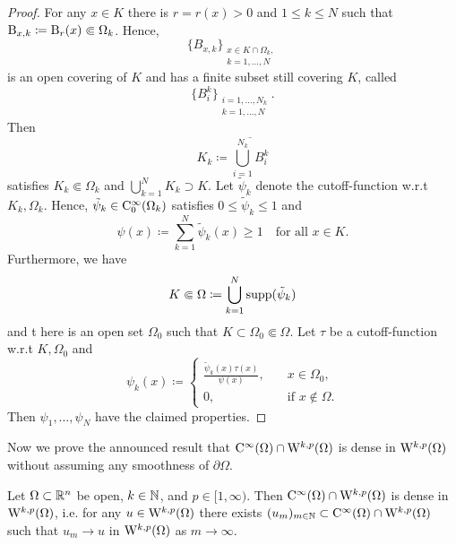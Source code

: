 \begin{proof}
  For any $x \in K$ there is $r = r(x) > 0$ and $1\leq k \leq N$ such that $\mathrm{B}_{x, k} \coloneqq \mathrm{B}_r(x) \Subset \Omega_k$.
  Hence, $$\{B_{x,k}\}_{\substack{x \in K \cap \Omega_k, \\ k = 1,\dots,N}}$$ is an open covering of $K$ and has a finite subset still covering $K$, called $$\{B_i^k\}_{\substack{i = 1,\dots,N_k \\ k = 1,\dots,N}}.$$ Then
  $$
  K_k \coloneqq \overline{\bigcup_{i = 1}^{N_k} B_i^k}
  $$
  satisfies $K_k \Subset \Omega_k$ and $\bigcup_{k = 1}^N K_k \supset K$.
  Let $\tilde \psi_k$ denote the cutoff-function w.r.t $K_k, \Omega_k$.
  Hence, $\tilde \psi_k \in \mathrm{C}_0^\infty(\Omega_k)$ satisfies $0 \leq \tilde \psi_k \leq 1$ and
  $$
  \psi(x) \coloneqq \sum_{k = 1}^N \tilde \psi_k(x) \geq 1 \quad\text{for all } x \in K.
  $$
  Furthermore, we have
  $$
  K \Subset \Omega \coloneqq \bigcup_{k = 1}^N \operatorname{supp}(\tilde \psi_k)
  $$
  and t here is an open set $\Omega_0$ such that $K \subset \Omega_0 \Subset \Omega$.
  Let $\tau$ be a cutoff-function w.r.t $K, \Omega_0$ and
  $$
  \psi_k(x) \coloneqq \begin{cases} \frac{\tilde \psi_k(x) \tau(x)}{\psi(x)}, &\quad x \in \Omega_0, \\ 0, &\quad \text{if } x \not\in \Omega. \end{cases}
  $$
  Then $\psi_1,\dots,\psi_N$ have the claimed properties.
\end{proof}

Now we prove the announced result that $\mathrm{C}^\infty(\Omega) \cap \mathrm{W}^{k,p}(\Omega)$ is dense in $\mathrm{W}^{k,p}(\Omega)$ without assuming any smoothness of $\partial \Omega$.

\begin{thm}
  \label{thm:meyersSerrin}
  Let $\Omega \subset \mathbb{R}^n$ be open, $k \in \mathbb{N}$, and $p \in [1,\infty)$.
    Then $\mathrm{C}^\infty(\Omega) \cap \mathrm{W}^{k,p}(\Omega)$ is dense in $\mathrm{W}^{k,p}(\Omega)$, i.e. for any $u \in \mathrm{W}^{k,p}(\Omega)$ there exists $(u_m)_{m \in \mathbb{N}} \subset \mathrm{C}^\infty(\Omega) \cap \mathrm{W}^{k,p}(\Omega)$ such that $u_m \to u$ in $\mathrm{W}^{k,p}(\Omega)$ as $m \to \infty$.
\end{thm}

